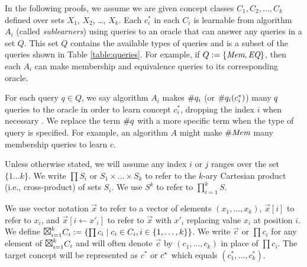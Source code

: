 In the following proofs, we assume we are given concept classes $C_1, C_2, \dots, C_k$ defined over sets $X_1$, $X_2$, \dots, $X_k$. 
Each $c^*_i$ in each $C_i$ is learnable from algorithm $A_i$ (called \emph{sublearners}) using queries to an oracle that can answer any queries in a set $Q$. 
This set $Q$ contains the available types of queries and is a subset of the queries shown in Table \ref{table:queries}.
For example, if $Q := \{ \emph{Mem}, \emph{EQ} \}$, then each $A_i$ can make membership and equivalence queries to its corresponding oracle. 


For each query $q \in Q$, we say algorithm $A_i$ makes $\#q_{i}$ (or $\#q_{i}(c^*_i)$) many $q$ queries to the oracle in order to learn concept $c^*_i$, dropping the index $i$ when necessary . 
We replace the term $\#q$ with a more specific term when the type of query is specified.
For example, an algorithm $A$ might make $\#\emph{Mem}$ many membership queries to learn $c$. 


Unless otherwise stated, we will assume any index $i$ or $j$ ranges over the set $\{ 1 \dots k \}$.
We write $\prod S_i$ or $S_1 \times \dots \times S_k$ to refer to the $k$-ary Cartesian product (i.e., cross-product) of sets $S_i$. 
We use $S^k$ to refer to $\prod_{i=1}^k S$. 

We use vector notation $\vec{x}$ to refer to a vector of elements $(x_1,\dots, x_k)$, $\vec{x}[i]$ to refer to $x_i$, and $\vec{x}[i \leftarrow x'_i]$ to refer to $\vec{x}$ with $x'_i$ replacing value $x_i$ at position $i$. 
We define $\Boxtimes^k_{i=1} C_i := \{ \prod c_i \mid c_i \in C_i, i \in \{1,\dots,k\} \}$. %
We write $\vec{c}$ or $\prod c_i$ for any element of $\Boxtimes^k_{i=1} C_i $ and will often denote $\vec{c}$ by $(c_1, \dots, c_k)$ in place of $\prod c_i$. 
The target concept will be represented as $c^*$ or $c^*$ which equals $(c^*_1, \dots, c^*_k)$.



